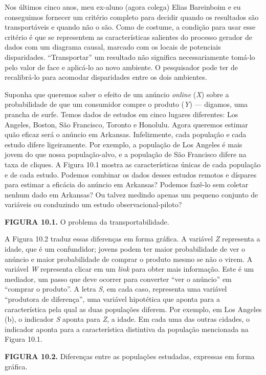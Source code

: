 \documentclass[11pt,a5paper,twoside]{book}
\begin{document}
Nos últimos cinco anos, meu ex-aluno (agora colega) Elias Bareinboim e eu conseguimos fornecer um critério completo para decidir quando os resultados são transportáveis e quando não o são. Como de costume, a condição para usar esse critério é que se representem as características salientes do processo gerador de dados com um diagrama causal, marcado com os locais de potenciais disparidades. “Transportar” um resultado não significa necessariamente tomá-lo pelo valor de face e aplicá-lo ao novo ambiente. O pesquisador pode ter de recalibrá-lo para acomodar disparidades entre os dois ambientes.

Suponha que queremos saber o efeito de um anúncio \textit{online} (\textit{X}) sobre a probabilidade de que um consumidor compre o produto (\textit{Y}) — digamos, uma prancha de surfe. Temos dados de estudos em cinco lugares diferentes: Los Angeles, Boston, São Francisco, Toronto e Honolulu. Agora queremos estimar quão eficaz será o anúncio em Arkansas. Infelizmente, cada população e cada estudo difere ligeiramente. Por exemplo, a população de Los Angeles é mais jovem do que nossa população-alvo, e a população de São Francisco difere na taxa de cliques. A Figura 10.1 mostra as características únicas de cada população e de cada estudo. Podemos combinar os dados desses estudos remotos e díspares para estimar a eficácia do anúncio em Arkansas? Podemos fazê-lo sem coletar nenhum dado em Arkansas? Ou talvez medindo apenas um pequeno conjunto de variáveis ou conduzindo um estudo observacional-piloto?

\textbf{FIGURA 10.1.} O problema da transportabilidade.

A Figura 10.2 traduz essas diferenças em forma gráfica. A variável \textit{Z} representa a idade, que é um confundidor; jovens podem ter maior probabilidade de ver o anúncio e maior probabilidade de comprar o produto mesmo se não o virem. A variável \textit{W} representa clicar em um \textit{link} para obter mais informação. Este é um mediador, um passo que deve ocorrer para converter “ver o anúncio” em “comprar o produto”. A letra \textit{S}, em cada caso, representa uma variável “produtora de diferença”, uma variável hipotética que aponta para a característica pela qual as duas populações diferem. Por exemplo, em Los Angeles (b), o indicador \textit{S} aponta para \textit{Z}, a idade. Em cada uma das outras cidades, o indicador aponta para a característica distintiva da população mencionada na Figura 10.1.

\textbf{FIGURA 10.2.} Diferenças entre as populações estudadas, expressas em forma gráfica.
\end{document}

